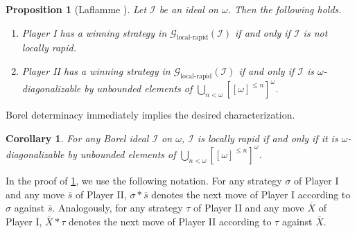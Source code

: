 \documentclass[a4paper,12pt]{amsart}
\newtheorem{prop}[thm]{Proposition}
\newtheorem{cor}[thm]{Corollary}
\theoremstyle{definition}
\numberwithin{thm}{section}
\numberwithin{equation}{section}
\newcommand{\I}{\mathscr{I}}
\begin{document}
    \begin{prop}[Laflamme \cite{Laf96}]\label{weakly_rapid_game}
        Let $\I$ be an ideal on $\omega$. Then the following holds.
        \begin{enumerate}
            \item Player I has a winning strategy in $\mathcal{G}_{\textrm{local-rapid}}(\I)$ if and only if $\I$ is not locally rapid.
            \item Player II has a winning strategy in $\mathcal{G}_{\textrm{local-rapid}}(\I)$ if and only if $\I$ is $\omega$-diagonalizable by unbounded elements of $\bigcup_{n<\omega}[[\omega]^{\leq n}]^{\omega}$.
        \end{enumerate}
    \end{prop}

    Borel determinacy immediately implies the desired characterization.
    
    \begin{cor}\label{char_of_weakly_rapid_for_Borel}
        For any Borel ideal $\I$ on $\omega$, $\I$ is locally rapid if and only if it is $\omega$-diagonalizable by unbounded elements of $\bigcup_{n<\omega}[[\omega]^{\leq n}]^{\omega}$.
    \end{cor}

    In the proof of \cref{weakly_rapid_game}, we use the following notation. For any strategy $\sigma$ of Player I and any move $\overline{s}$ of Player II, $\sigma * \overline{s}$ denotes the next move of Player I according to $\sigma$ against $\overline{s}$. Analogously, for any strategy $\tau$ of Player II and any move $\overline{X}$ of Player I, $\overline{X}*\tau$ denotes the next move of Player II according to $\tau$ against $\overline{X}$.
\end{document}
